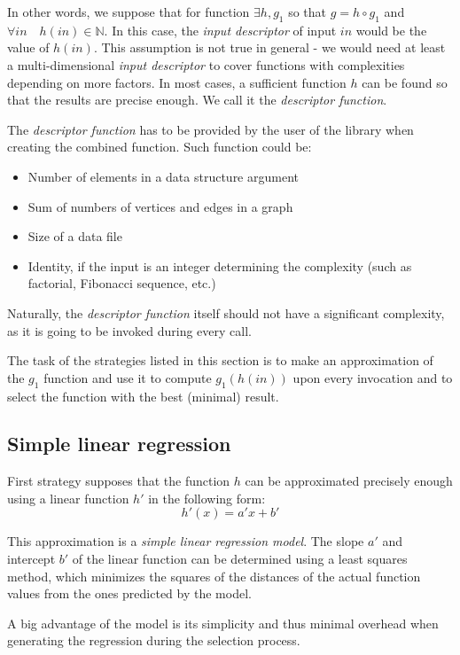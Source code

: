 In other words, we suppose that for function  \(\exists h, g_1\) so that
\(g = h \circ g_1\) 
and 
\(\forall in \quad h(in) \in \mathbb{N}\). In this case, the \textit{input descriptor} of input \(in\) would be the value of \(h(in)\).
This assumption is not true in general - we would need at least a multi-dimensional \textit{input descriptor} to cover functions with complexities depending on more factors. In most cases, a sufficient function \(h\) can be found so that the results are precise enough. We call it the \textit{descriptor function}.

The \textit{descriptor function} has to be provided by the user of the library when creating the combined function. %
Such function could be:
\begin{itemize}
	\item Number of elements in a data structure argument
	\item Sum of numbers of vertices and edges in a graph
	\item Size of a data file
	\item Identity, if the input is an integer determining the complexity (such as factorial, Fibonacci sequence, etc.)
\end{itemize}
Naturally, the \textit{descriptor function} itself should not have a significant complexity, as it is going to be invoked during every call.

The task of the strategies listed in this section is to make an approximation of the \(g_1\) function and use it to compute \(g_1(h(in))\) upon every invocation and to select the function with the best (minimal) result.

\subsection{Simple linear regression}
\label{subsec:simple_linear_regression}

First strategy supposes that the function \(h\) can be approximated precisely enough using a linear function \(h'\) in the following form:
\[h'(x) = a' x + b'\]

This approximation is a \textit{simple linear regression model}. The slope \(a'\) and intercept \(b'\) of the linear function can be determined using a least squares method, which minimizes the squares of the distances of the actual function values from the ones predicted by the model.

A big advantage of the model is its simplicity and thus minimal overhead when generating the regression during the selection process. 

